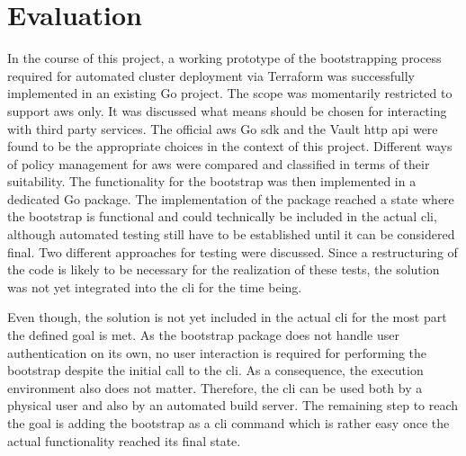 \chapter{Evaluation}
In the course of this project, a working prototype of the bootstrapping process required for automated cluster deployment via Terraform was successfully implemented in an existing Go project.
The scope was momentarily restricted to support \ac{aws} only.
It was discussed what means should be chosen for interacting with third party services.
The official \ac{aws} Go \ac{sdk} and the Vault \ac{http} \ac{api} were found to be the appropriate choices in the context of this project.
Different ways of policy management for \ac{aws} were compared and classified in terms of their suitability.
The functionality for the bootstrap was then implemented in a dedicated Go package.
The implementation of the package reached a state where the bootstrap is functional and could technically be included in the actual \ac{cli}, although automated testing still have to be established until it can be considered final.
Two different approaches for testing were discussed.
Since a restructuring of the code is likely to be necessary for the realization of these tests, the solution was not yet integrated into the \ac{cli} for the time being.

Even though, the solution is not yet included in the actual \ac{cli} for the most part the defined goal is met.
As the bootstrap package does not handle user authentication on its own, no user interaction is required for performing the bootstrap despite the initial call to the \ac{cli}.
As a consequence, the execution environment also does not matter.
Therefore, the \ac{cli} can be used both by a physical user and also by an automated build server.
The remaining step to reach the goal is adding the bootstrap as a \ac{cli} command which is rather easy once the actual functionality reached its final state.



